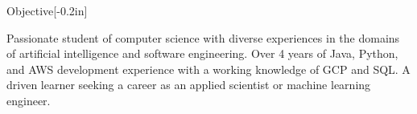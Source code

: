 \vspace{-0.5in}\textsl{}
\begin{rsection}{Objective}[-0.2in]
	\begin{normalsize}
    Passionate student of computer science with diverse experiences in the domains of artificial intelligence and software engineering. Over 4 years of Java, Python, and AWS development experience with a working knowledge of GCP and SQL. A driven learner seeking a career as an applied scientist or machine learning engineer.
   	\end{normalsize}
\end{rsection}